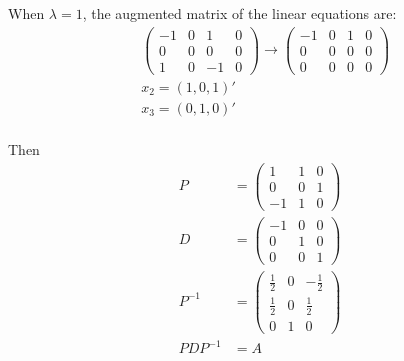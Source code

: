 \documentclass[letterpaper, 11pt]{article}
\newcommand{\1}{\mathds{1}}	%
\theoremstyle{definition}
\begin{document}
When $\lambda = 1$, the augmented matrix of the linear equations are: \begin{align*}
     & \left(\begin{array}{ccc|c}
                     -1 & 0 & 1  & 0 \\
                     0  & 0 & 0  & 0 \\
                     1  & 0 & -1 & 0
                 \end{array}\right) \to \left(\begin{array}{ccc|c}
                                                  -1 & 0 & 1 & 0 \\
                                                  0  & 0 & 0 & 0 \\
                                                  0  & 0 & 0 & 0
                                              \end{array}\right) \\
     & x_{2} = (1,0,1)'                                       \\
     & x_{3} = (0,1,0)'                                       \\
\end{align*}

Then \begin{align*}
    P         & = \begin{pmatrix}
                      1  & 1 & 0 \\
                      0  & 0 & 1 \\
                      -1 & 1 & 0
                  \end{pmatrix}                 \\
    D         & = \begin{pmatrix}
                      -1 & 0 & 0 \\
                      0  & 1 & 0 \\
                      0  & 0 & 1
                  \end{pmatrix}                 \\
    P ^{-1}   & = \begin{pmatrix}
                      \frac{1}{2} & 0 & -\frac{1}{2} \\
                      \frac{1}{2} & 0 & \frac{1}{2}  \\
                      0           & 1 & 0
                  \end{pmatrix} \\
    PDP ^{-1} & =  A
\end{align*}
\end{document}

